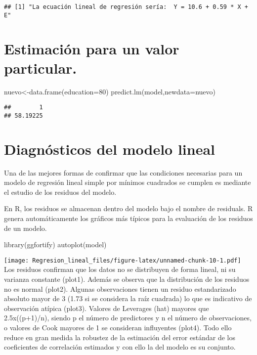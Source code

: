 \documentclass[
]{article}
\newenvironment{Shaded}{\begin{snugshade}}{\end{snugshade}}
\newcommand{\AttributeTok}[1]{\textcolor[rgb]{0.77,0.63,0.00}{#1}}
\newcommand{\DecValTok}[1]{\textcolor[rgb]{0.00,0.00,0.81}{#1}}
\newcommand{\FunctionTok}[1]{\textcolor[rgb]{0.00,0.00,0.00}{#1}}
\newcommand{\NormalTok}[1]{#1}
\newcommand{\OtherTok}[1]{\textcolor[rgb]{0.56,0.35,0.01}{#1}}
\begin{document}
\begin{verbatim}
## [1] "La ecuación lineal de regresión sería:  Y = 10.6 + 0.59 * X + E"
\end{verbatim}

\hypertarget{estimaciuxf3n-para-un-valor-particular.}{%
\section{Estimación para un valor
particular.}\label{estimaciuxf3n-para-un-valor-particular.}}

\begin{Shaded}
\begin{Highlighting}[]
\NormalTok{nuevo}\OtherTok{\textless{}{-}}\FunctionTok{data.frame}\NormalTok{(}\AttributeTok{education=}\DecValTok{80}\NormalTok{)}
\FunctionTok{predict.lm}\NormalTok{(model,}\AttributeTok{newdata=}\NormalTok{nuevo)}
\end{Highlighting}
\end{Shaded}

\begin{verbatim}
##        1 
## 58.19225
\end{verbatim}

\hypertarget{diagnuxf3sticos-del-modelo-lineal}{%
\section{Diagnósticos del modelo
lineal}\label{diagnuxf3sticos-del-modelo-lineal}}

Una de las mejores formas de confirmar que las condiciones necesarias
para un modelo de regresión lineal simple por mínimos cuadrados se
cumplen es mediante el estudio de los residuos del modelo.

En R, los residuos se almacenan dentro del modelo bajo el nombre de
residuals. R genera automáticamente los gráficos más típicos para la
evaluación de los residuos de un modelo.

\begin{Shaded}
\begin{Highlighting}[]
\FunctionTok{library}\NormalTok{(ggfortify)}
\FunctionTok{autoplot}\NormalTok{(model)}
\end{Highlighting}
\end{Shaded}

\texttt{[image: Regresion\_lineal\_files/figure-latex/unnamed-chunk-10-1.pdf]}
Los residuos confirman que los datos no se distribuyen de forma lineal,
ni su varianza constante (plot1). Además se observa que la distribución
de los residuos no es normal (plot2). Algunas observaciones tienen un
residuo estandarizado absoluto mayor de 3 (1.73 si se considera la raíz
cuadrada) lo que es indicativo de observación atípica (plot3). Valores
de Leverages (hat) mayores que 2.5x((p+1)/n), siendo p el número de
predictores y n el número de observaciones, o valores de Cook mayores de
1 se consideran influyentes (plot4). Todo ello reduce en gran medida la
robustez de la estimación del error estándar de los coeficientes de
correlación estimados y con ello la del modelo es su conjunto.
\end{document}

